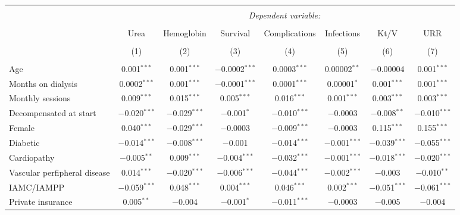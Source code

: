 
\begin{table}[!htbp] \centering 
  \caption{} 
  \label{} 
\begin{tabular}{@{\extracolsep{5pt}}lccccccc} 
\\[-1.8ex]\hline 
\hline \\[-1.8ex] 
 & \multicolumn{7}{c}{\textit{Dependent variable:}} \\ 
\cline{2-8} 
\\[-1.8ex] & Urea & Hemoglobin & Survival & Complications & Infections & Kt/V & URR \\ 
\\[-1.8ex] & (1) & (2) & (3) & (4) & (5) & (6) & (7)\\ 
\hline \\[-1.8ex] 
 Age & 0.001$^{***}$ & 0.001$^{***}$ & $-$0.0002$^{***}$ & 0.0003$^{***}$ & 0.00002$^{**}$ & $-$0.00004 & 0.001$^{***}$ \\ 
  Months on dialysis & 0.0002$^{***}$ & 0.001$^{***}$ & $-$0.0001$^{***}$ & 0.0001$^{***}$ & 0.00001$^{*}$ & 0.001$^{***}$ & 0.001$^{***}$ \\ 
  Monthly sessions & 0.009$^{***}$ & 0.015$^{***}$ & 0.005$^{***}$ & 0.016$^{***}$ & 0.001$^{***}$ & 0.003$^{***}$ & 0.003$^{***}$ \\ 
  Decompensated at start & $-$0.020$^{***}$ & $-$0.029$^{***}$ & $-$0.001$^{*}$ & $-$0.010$^{***}$ & $-$0.0003 & $-$0.008$^{**}$ & $-$0.010$^{***}$ \\ 
  Female & 0.040$^{***}$ & $-$0.029$^{***}$ & $-$0.0003 & $-$0.009$^{***}$ & $-$0.0003 & 0.115$^{***}$ & 0.155$^{***}$ \\ 
  Diabetic & $-$0.014$^{***}$ & $-$0.008$^{***}$ & $-$0.001 & $-$0.014$^{***}$ & $-$0.001$^{***}$ & $-$0.039$^{***}$ & $-$0.055$^{***}$ \\ 
  Cardiopathy & $-$0.005$^{**}$ & 0.009$^{***}$ & $-$0.004$^{***}$ & $-$0.032$^{***}$ & $-$0.001$^{***}$ & $-$0.018$^{***}$ & $-$0.020$^{***}$ \\ 
  Vascular perfipheral disease & 0.014$^{***}$ & $-$0.020$^{***}$ & $-$0.006$^{***}$ & $-$0.044$^{***}$ & $-$0.002$^{***}$ & $-$0.003 & $-$0.010$^{**}$ \\ 
  IAMC/IAMPP & $-$0.059$^{***}$ & 0.048$^{***}$ & 0.004$^{***}$ & 0.046$^{***}$ & 0.002$^{***}$ & $-$0.051$^{***}$ & $-$0.061$^{***}$ \\ 
  Private insurance & 0.005$^{**}$ & $-$0.004 & $-$0.001$^{*}$ & $-$0.011$^{***}$ & $-$0.0003 & $-$0.005 & $-$0.004 \\ 

\end{tabular}
\end{table}
